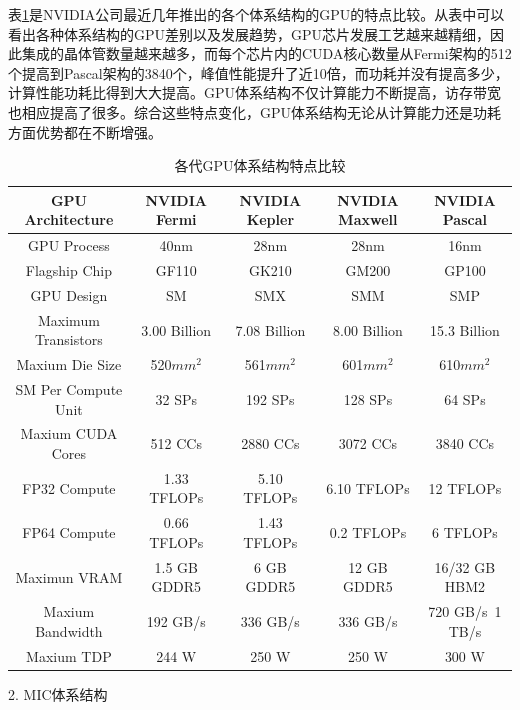        表\ref{GPUProperty}是NVIDIA公司最近几年推出的各个体系结构的GPU的特点比较。从表中可以看出各种体系结构的GPU差别以及发展趋势，GPU芯片发展工艺越来越精细，因此集成的晶体管数量越来越多，而每个芯片内的CUDA核心数量从Fermi架构的512个提高到Pascal架构的3840个，峰值性能提升了近10倍，而功耗并没有提高多少，计算性能功耗比得到大大提高。GPU体系结构不仅计算能力不断提高，访存带宽也相应提高了很多。综合这些特点变化，GPU体系结构无论从计算能力还是功耗方面优势都在不断增强。
       
       \begin{table}[]
       \centering
       \caption{各代GPU体系结构特点比较}
       \label{GPUProperty}
       \begin{tabular}{|c|c|c|c|c|}
       \hline
       \textbf{GPU Architecture} & \textbf{NVIDIA Fermi}       & \textbf{NVIDIA Kepler}  & \textbf{NVIDIA Maxwell} & \textbf{NVIDIA Pascal} \\ \hline
       GPU Process & 40nm & 28nm  & 28nm & 16nm   \\ \hline
       Flagship Chip & GF110 & GK210  & GM200 & GP100   \\ \hline
       GPU Design & SM & SMX  & SMM & SMP   \\ \hline
       Maximum Transistors & 3.00 Billion & 7.08 Billion  & 8.00 Billion & 15.3 Billion   \\ \hline
       Maxium Die Size & 520${mm^2}$ & 561${mm^2}$  & 601${mm^2}$ & 610${mm^2}$   \\ \hline
       SM Per Compute Unit & 32 SPs & 192 SPs  & 128 SPs & 64 SPs   \\ \hline
       Maxium CUDA Cores & 512 CCs & 2880 CCs  & 3072 CCs & 3840 CCs   \\ \hline
       FP32 Compute & 1.33 TFLOPs & 5.10 TFLOPs  & 6.10 TFLOPs & 12 TFLOPs   \\ \hline
       FP64 Compute & 0.66 TFLOPs & 1.43 TFLOPs  & 0.2 TFLOPs & 6 TFLOPs   \\ \hline
       Maximun VRAM & 1.5 GB GDDR5 & 6 GB GDDR5  & 12 GB GDDR5 & 16/32 GB HBM2   \\ \hline
       Maxium Bandwidth & 192 GB/s & 336 GB/s  & 336 GB/s & 720 GB/s~1 TB/s   \\ \hline
       Maxium TDP & 244 W & 250 W  & 250 W & 300 W   \\ \hline
       
      \end{tabular}
      \end{table} 
       
       2. MIC体系结构
       
